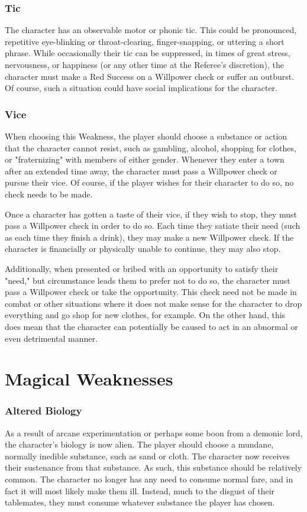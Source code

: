 \documentclass[oneside]{book}
\begin{document}
\begin{multicols}{2}
\subsubsection{Tic}
The character has an observable motor or phonic tic. This could be pronounced, repetitive eye-blinking or throat-clearing, finger-snapping, or uttering a short phrase. While occasionally their tic can be suppressed, in times of great stress, nervousness, or happiness (or any other time at the Referee's discretion), the character must make a Red Success on a Willpower check or suffer an outburst. Of course, such a situation could have social implications for the character. 
\subsubsection{Vice}
When choosing this Weakness, the player should choose a substance or action that the character cannot resist, such as gambling, alcohol, shopping for clothes, or "fraternizing" with members of either gender. Whenever they enter a town after an extended time away, the character must pass a Willpower check or pursue their vice. Of course, if the player wishes for their character to do so, no check needs to be made.

Once a character has gotten a taste of their vice, if they wish to stop, they must pass a Willpower check in order to do so. Each time they satiate their need (such as each time they finish a drink), they may make a new Willpower check. If the character is financially or physically unable to continue, they may also stop. 

Additionally, when presented or bribed with an opportunity to satisfy their "need," but circumstance leads them to prefer not to do so, the character must pass a Willpower check or take the opportunity. This check need not be made in combat or other situations where it does not make sense for the character to drop everything and go shop for new clothes, for example. On the other hand, this does mean that the character can potentially be caused to act in an abnormal or even detrimental manner. 

\section{Magical Weaknesses}
\subsubsection{Altered Biology}
As a result of arcane experimentation or perhaps some boon from a demonic lord, the character's biology is now alien. The player should choose a mundane, normally inedible substance, such as sand or cloth. The character now receives their sustenance from that substance. As such, this substance should be relatively common. The character no longer has any need to consume normal fare, and in fact it will most likely make them ill. Instead, much to the disgust of their tablemates, they must consume whatever substance the player has chosen. 


\end{multicols}
\end{document}
